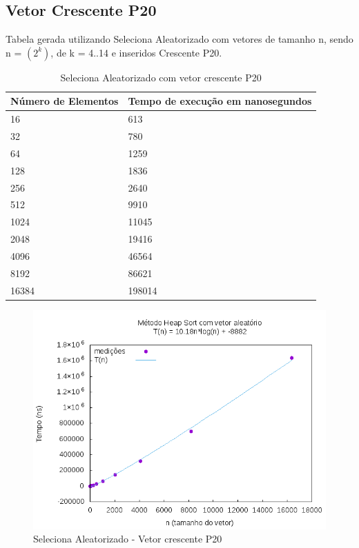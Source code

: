 \documentclass[12pt,a4paper,twoside]{report}
\begin{document}
\subsection{Vetor Crescente P20}
Tabela gerada utilizando Seleciona Aleatorizado com vetores de tamanho n, sendo n = $(2^k)$, de k = 4..14 e inseridos Crescente P20.
\begin{table}[H]
\centering
\caption{Seleciona Aleatorizado com vetor crescente P20}
\label{my-label}
\begin{tabular}{|l|l|}
\hline
\multicolumn{1}{|c|}{\textbf{Número de Elementos}} & \multicolumn{1}{c|}{\textbf{Tempo de execução em nanosegundos}} \\ \hline
16 & 613 \\ \hline
32 & 780 \\ \hline
64 & 1259 \\ \hline
128 & 1836 \\ \hline
256 & 2640 \\ \hline
512 & 9910 \\ \hline
1024 & 11045 \\ \hline
2048 & 19416 \\ \hline
4096 & 46564 \\ \hline
8192 & 86621 \\ \hline
16384 & 198014 \\ \hline

\end{tabular}
\end{table}

\begin{figure}[H]
    \centering
    \includegraphics[width=0.7\linewidth]{graficos/HeapSort/vIntAleatorio/vIntAleatorio.png}
  \caption{Seleciona Aleatorizado - Vetor crescente P20}
\end{figure}
\end{document}
